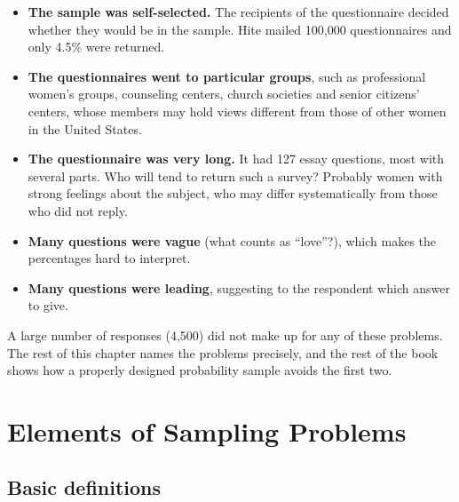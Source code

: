 \documentclass[
  letterpaper,
  DIV=11,
  numbers=noendperiod]{scrreprt}
\providecommand{\tightlist}{%
  \setlength{\itemsep}{0pt}\setlength{\parskip}{0pt}}
\renewcommand{\[}{\begin{equation}}
\renewcommand{\]}{\end{equation}}
\begin{document}
\begin{itemize}
\tightlist
\item
  \textbf{The sample was self-selected.} The recipients of the
  questionnaire decided whether they would be in the sample. Hite mailed
  100,000 questionnaires and only 4.5\% were returned.
\item
  \textbf{The questionnaires went to particular groups}, such as
  professional women's groups, counseling centers, church societies and
  senior citizens' centers, whose members may hold views different from
  those of other women in the United States.
\item
  \textbf{The questionnaire was very long.} It had 127 essay questions,
  most with several parts. Who will tend to return such a survey?
  Probably women with strong feelings about the subject, who may differ
  systematically from those who did not reply.
\item
  \textbf{Many questions were vague} (what counts as ``love''?), which
  makes the percentages hard to interpret.
\item
  \textbf{Many questions were leading}, suggesting to the respondent
  which answer to give.
\end{itemize}

A large number of responses (4,500) did not make up for any of these
problems. The rest of this chapter names the problems precisely, and the
rest of the book shows how a properly designed probability sample avoids
the first two.

\section{Elements of Sampling Problems}\label{sec-intro-elements}

\subsection{Basic definitions}\label{basic-definitions}
\end{document}
